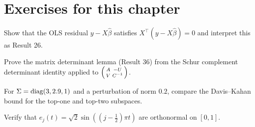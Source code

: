\section*{Exercises for this chapter}
\begin{exercise}
Show that the OLS residual $y-X\hat\beta$ satisfies $X^\top(y-X\hat\beta)=0$
and interpret this as Result 26.
\end{exercise}
\begin{exercise}
Prove the matrix determinant lemma (Result 36) from the Schur complement
determinant identity applied to $\begin{psmallmatrix}A&-U\\V&C^{-1}\end{psmallmatrix}$.
\end{exercise}
\begin{exercise}
For $\Sigma=\operatorname{diag}(3,2.9,1)$ and a perturbation of norm $0.2$, compare
the Davis--Kahan bound for the top-one and top-two subspaces.
\end{exercise}
\begin{exercise}
Verify that $e_j(t)=\sqrt2\sin((j-\tfrac12)\pi t)$ are orthonormal on $[0,1]$.
\end{exercise}
